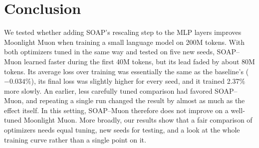 \section{Conclusion}

We tested whether adding SOAP's rescaling step to the MLP layers improves
Moonlight Muon when training a small language model on 200M tokens. With both
optimizers tuned in the same way and tested on five new seeds, SOAP--Muon
learned faster during the first 40M tokens, but its lead faded by about 80M
tokens. Its average loss over training was essentially the same as the
baseline's ($-0.034\%$), its final loss was slightly higher for every seed, and
it trained 2.37\% more slowly. An earlier, less carefully tuned comparison had
favored SOAP--Muon, and repeating a single run changed the result by almost as
much as the effect itself. In this setting, SOAP--Muon therefore does not
improve on a well-tuned Moonlight Muon. More broadly, our results show that a
fair comparison of optimizers needs equal tuning, new seeds for testing, and a
look at the whole training curve rather than a single point on it.
